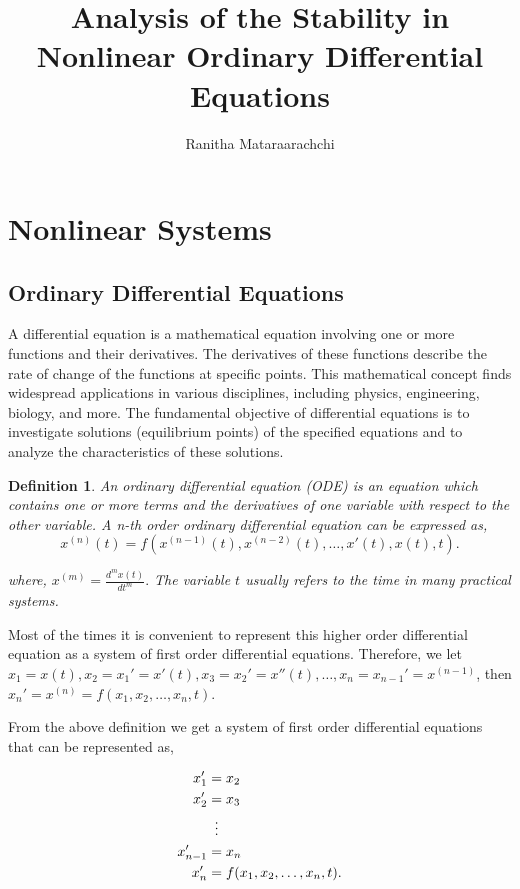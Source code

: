 \documentclass{article}
\title{Analysis of the Stability in Nonlinear Ordinary Differential Equations}
\author{Ranitha Mataraarachchi}
\affil{Department of Engineering Mathematics, Faculty of Engineering, University of Peradeniya, Peradeniya, Sri Lanka.}
\newtheorem{definition}{Definition}
\begin{document}
\maketitle

\section{Nonlinear Systems}
\subsection{Ordinary Differential Equations}

A differential equation is a mathematical equation involving one or more functions and their derivatives. The derivatives of these functions describe the rate of change of the functions at specific points. This mathematical concept finds widespread applications in various disciplines, including physics, engineering, biology, and more. The fundamental objective of differential equations is to investigate solutions (equilibrium points) of the specified equations and to analyze the characteristics of these solutions.

\begin{definition}
    An ordinary differential equation (ODE) is an equation which contains one or more terms and the derivatives of one variable with respect to the other variable. A \emph{n-th order} ordinary differential equation can be expressed as,
\begin{equation}
    x^{(n)}(t)=f(x^{(n-1)}(t),x^{(n-2)}(t),\dots,x'(t),x(t),t).
\end{equation}

where, $x^{(m)}=\frac{d^mx(t)}{dt^m}.$ The variable $t$ usually refers to the time in many practical systems.
\end{definition}

Most of the times it is convenient to represent this higher order differential equation as a system of first order differential equations. Therefore, we let $x_1=x(t), x_2=x_1'=x'(t), x_3=x_2'=x''(t),\dots,x_n=x_{n-1}'=x^{(n-1)}$, then $x_n'=x^{(n)} = f(x_1,x_2,\dots,x_n,t).$

From the above definition we get a system of first order differential equations that can be represented as,

\begin{align*}
  x_1' &= x_2\\
  x_2' &= x_3\\
     &\mathrel{\makebox[\widthof{=}]{\vdots}} \\
  x_{n-1}' &= x_n\\
  x_{n}' &= f(x_1,x_2,\dots,x_n,t).
\end{align*}
\end{document}
